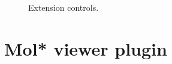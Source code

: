 \documentclass[
  digital,     %
  oneside,     %
  nosansbold,  %
  nocolorbold, %
  lof,         %
  lot,         %
]{fithesis4}
\begin{document}
\begin{figure}[htbp]
  \centering
  \caption{Extension controls.}
  \label{fig:controls-charge-set}
\end{figure}

\section{Mol* viewer plugin}
\label{section:molstar_viewer_plugin}
\end{document}
